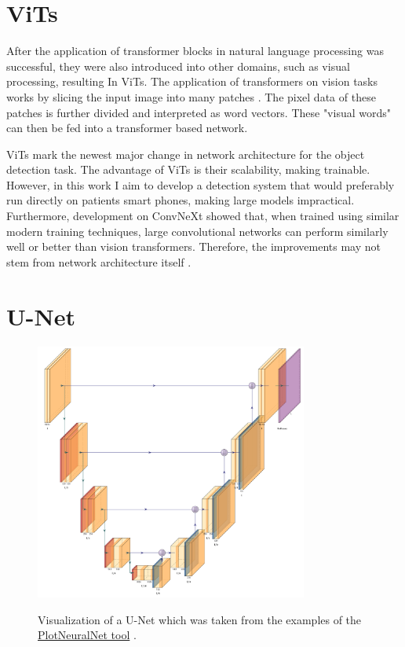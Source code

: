\documentclass[10pt]{book}
\begin{document}

\section{ViTs}

After the application of transformer blocks in natural language processing was successful, they were also introduced into other domains, such as visual processing, resulting In \acp{ViT}. The application of transformers on vision tasks works by slicing the input image into many patches \cite{dosovitskiy2020image}. The pixel data of these patches is further divided and interpreted as word vectors. These "visual words" can then be fed into a transformer based network.

\acp{ViT} mark the newest major change in network architecture for the object detection task. The advantage of \acp{ViT} is their scalability, making \cite[models of unprecedented size]{dosovitskiy2020image} trainable. However, in this work I aim to develop a detection system that would preferably run directly on patients smart phones, making large models impractical. Furthermore, development on ConvNeXt showed that, when trained using similar modern training techniques, large convolutional networks can perform similarly well or better than vision transformers. Therefore, the improvements may not stem from network architecture itself \cite{liu2022convnet}.

\section{U-Net}

\begin{figure}
  \caption{Visualization of a U-Net which was taken from the examples of the \href{https://github.com/HarisIqbal88/PlotNeuralNet}{PlotNeuralNet tool} \cite{haris_iqbal_2018_2526396}.}
  \includegraphics[width=0.8\textwidth]{image/Unet_ushape}
  \label{fig:unet}
\end{figure}
\end{document}
